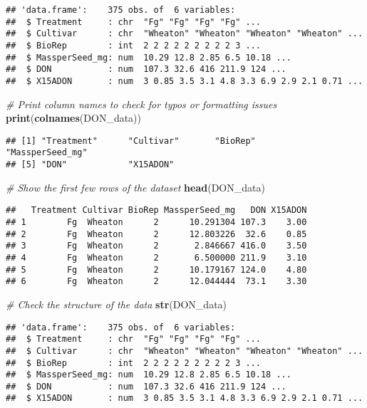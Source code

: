 \documentclass[
]{article}
\newenvironment{Shaded}{\begin{snugshade}}{\end{snugshade}}
\newcommand{\CommentTok}[1]{\textcolor[rgb]{0.56,0.35,0.01}{\textit{#1}}}
\newcommand{\FunctionTok}[1]{\textcolor[rgb]{0.13,0.29,0.53}{\textbf{#1}}}
\newcommand{\NormalTok}[1]{#1}
\begin{document}
\begin{verbatim}
## 'data.frame':    375 obs. of  6 variables:
##  $ Treatment     : chr  "Fg" "Fg" "Fg" "Fg" ...
##  $ Cultivar      : chr  "Wheaton" "Wheaton" "Wheaton" "Wheaton" ...
##  $ BioRep        : int  2 2 2 2 2 2 2 2 2 3 ...
##  $ MassperSeed_mg: num  10.29 12.8 2.85 6.5 10.18 ...
##  $ DON           : num  107.3 32.6 416 211.9 124 ...
##  $ X15ADON       : num  3 0.85 3.5 3.1 4.8 3.3 6.9 2.9 2.1 0.71 ...
\end{verbatim}

\begin{Shaded}
\begin{Highlighting}[]
\CommentTok{\# Print column names to check for typos or formatting issues}
\FunctionTok{print}\NormalTok{(}\FunctionTok{colnames}\NormalTok{(DON\_data))}
\end{Highlighting}
\end{Shaded}

\begin{verbatim}
## [1] "Treatment"      "Cultivar"       "BioRep"         "MassperSeed_mg"
## [5] "DON"            "X15ADON"
\end{verbatim}

\begin{Shaded}
\begin{Highlighting}[]
\CommentTok{\# Show the first few rows of the dataset}
\FunctionTok{head}\NormalTok{(DON\_data)}
\end{Highlighting}
\end{Shaded}

\begin{verbatim}
##   Treatment Cultivar BioRep MassperSeed_mg   DON X15ADON
## 1        Fg  Wheaton      2      10.291304 107.3    3.00
## 2        Fg  Wheaton      2      12.803226  32.6    0.85
## 3        Fg  Wheaton      2       2.846667 416.0    3.50
## 4        Fg  Wheaton      2       6.500000 211.9    3.10
## 5        Fg  Wheaton      2      10.179167 124.0    4.80
## 6        Fg  Wheaton      2      12.044444  73.1    3.30
\end{verbatim}

\begin{Shaded}
\begin{Highlighting}[]
\CommentTok{\# Check the structure of the data}
\FunctionTok{str}\NormalTok{(DON\_data)}
\end{Highlighting}
\end{Shaded}

\begin{verbatim}
## 'data.frame':    375 obs. of  6 variables:
##  $ Treatment     : chr  "Fg" "Fg" "Fg" "Fg" ...
##  $ Cultivar      : chr  "Wheaton" "Wheaton" "Wheaton" "Wheaton" ...
##  $ BioRep        : int  2 2 2 2 2 2 2 2 2 3 ...
##  $ MassperSeed_mg: num  10.29 12.8 2.85 6.5 10.18 ...
##  $ DON           : num  107.3 32.6 416 211.9 124 ...
##  $ X15ADON       : num  3 0.85 3.5 3.1 4.8 3.3 6.9 2.9 2.1 0.71 ...
\end{verbatim}
\end{document}
